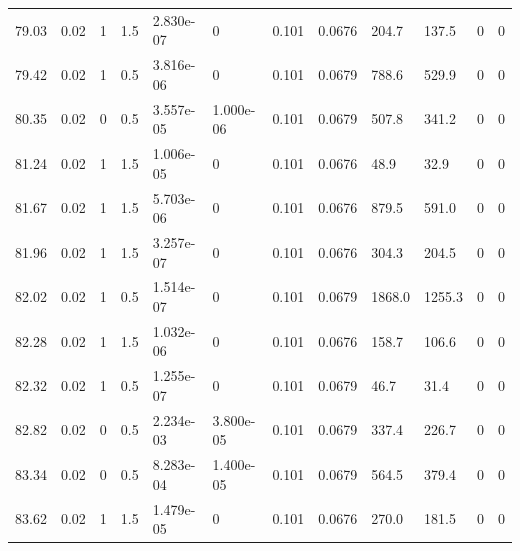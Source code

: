 \documentclass[preview]{standalone}
\begin{document}
{{{{{\begin{tabular}{L{1.2cm}C{1.2cm} C{0.3cm}C{0.5cm} C{1.4cm}C{1.4cm} C{1.4cm}C{1.4cm} C{1.6cm}C{1.6cm} C{1.6cm}C{1.6cm}}
  79.03  &  0.02  & 1     & 1.5 &  2.830e-07  & 0  &  0.101&   0.0676& 204.7 & 137.5   &  0 & 0  \\ 
  79.42  &  0.02  & 1     & 0.5 &  3.816e-06  & 0  &  0.101&   0.0679& 788.6 & 529.9   &  0 & 0  \\ 
  80.35  &  0.02  & 0     & 0.5 &  3.557e-05  & 1.000e-06  &  0.101&   0.0679& 507.8 & 341.2   &  0 & 0  \\ 
  81.24  &  0.02  & 1     & 1.5 &  1.006e-05  & 0  &  0.101&   0.0676& 48.9 & 32.9   &  0 & 0  \\ 
  81.67  &  0.02  & 1     & 1.5 &  5.703e-06  & 0  &  0.101&   0.0676& 879.5 & 591.0   &  0 & 0  \\ 
  81.96  &  0.02  & 1     & 1.5 &  3.257e-07  & 0  &  0.101&   0.0676& 304.3 & 204.5   &  0 & 0  \\ 
  82.02  &  0.02  & 1     & 0.5 &  1.514e-07  & 0  &  0.101&   0.0679& 1868.0 & 1255.3   &  0 & 0  \\ 
  82.28  &  0.02  & 1     & 1.5 &  1.032e-06  & 0  &  0.101&   0.0676& 158.7 & 106.6   &  0 & 0  \\ 
  82.32  &  0.02  & 1     & 0.5 &  1.255e-07  & 0  &  0.101&   0.0679& 46.7 & 31.4   &  0 & 0  \\ 
  82.82  &  0.02  & 0     & 0.5 &  2.234e-03  & 3.800e-05  &  0.101&   0.0679& 337.4 & 226.7   &  0 & 0  \\ 
  83.34  &  0.02  & 0     & 0.5 &  8.283e-04  & 1.400e-05  &  0.101&   0.0679& 564.5 & 379.4   &  0 & 0  \\ 
  83.62  &  0.02  & 1     & 1.5 &  1.479e-05  & 0  &  0.101&   0.0676& 270.0 & 181.5   &  0 & 0  \\ 
\hline 
\end{tabular} 

}}}}}
\end{document}
